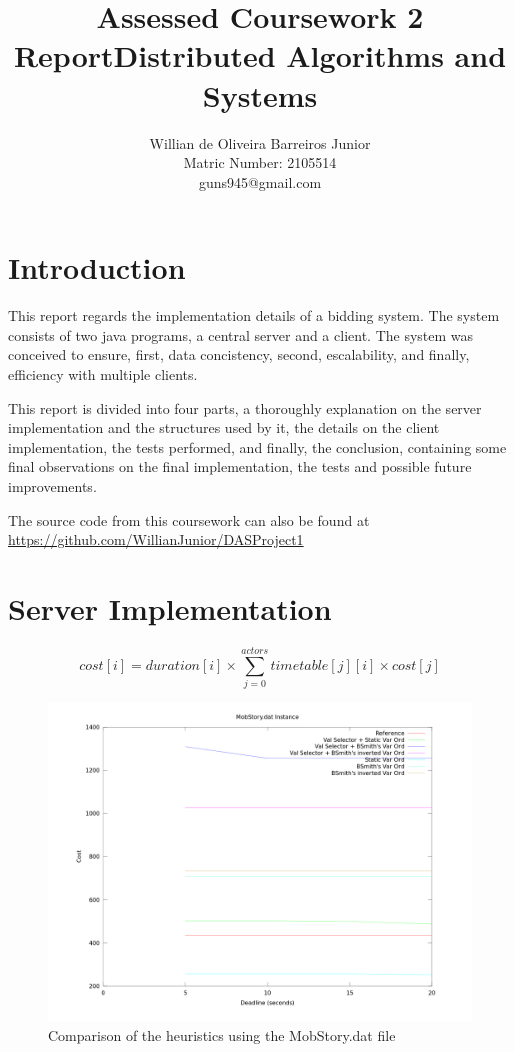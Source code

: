 \documentclass[twocolumn,10pt]{article}
\title{Assessed Coursework 2 Report\linebreak Distributed Algorithms and Systems}
\author{Willian de Oliveira Barreiros Junior\\
Matric Number: 2105514\\
 guns945@gmail.com\\}
\begin{document}
\maketitle

\section{Introduction}
This report regards the implementation details of a bidding system. The system consists of two java programs, a central server and a client. The system was conceived to ensure, first, data concistency, second, escalability, and finally, efficiency with multiple clients.

This report is divided into four parts, a thoroughly explanation on the server implementation and the structures used by it, the details on the client implementation, the tests performed, and finally, the conclusion, containing some final observations on the final implementation, the tests and possible future improvements.

The source code from this coursework can also be found at
\url{https://github.com/WillianJunior/DASProject1}

\section{Server Implementation}


\begin{equation}\label{eq:sceneCost}
cost[i] = duration[i]\times\sum_{j=0}^{actors}timetable[j][i]\times cost[j]
\end{equation}

\begin{figure}[h]
\centering
\includegraphics[scale=0.18]{mobs.png}
\caption{Comparison of the heuristics using the MobStory.dat file}
\label{fig:mobs}
\end{figure}
\end{document}
